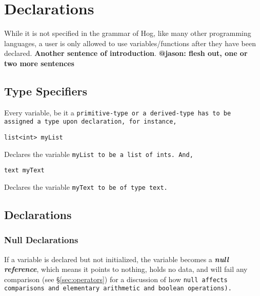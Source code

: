 \documentclass{book}
\begin{document}


\chapter{Declarations} %
\label{cha:declarations}

While it is not specified in the grammar of Hog, like many other programming
languages, a user is only allowed to use variables/functions after they have been
declared. \textbf{Another sentence of introduction}. \textbf{@jason: flesh out, one or two more sentences}

\section{Type Specifiers} %
\label{sec:type_specifiers}

Every variable, be it a \tt primitive-type \rm or a \tt derived-type \rm has to be
assigned a type upon declaration, for instance,

\begin{verbatim}
list<int> myList
\end{verbatim}

Declares the variable \tt myList \rm to be a \tt list \rm of \tt int\rm s. And,

\begin{verbatim}
text myText
\end{verbatim}

Declares the variable \tt myText \rm to be of type \tt text\rm .


\section{Declarations} %
\label{sec:declarations}

\subsection{Null Declarations} %
\label{sub:null_declarations}

If a variable is declared but not initialized, the variable becomes a
\textbf{\emph{null reference}}, which means it points to nothing, holds no data,
and will fail any comparison (see \S \ref{sec:operators}) for a discussion of how
\tt null \rm affects comparisons and elementary arithmetic and boolean operations).
\end{document}
